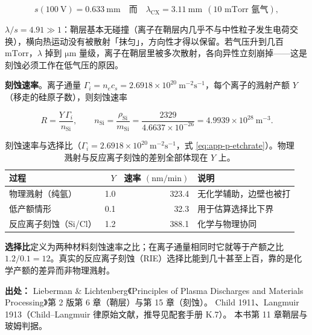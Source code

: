 \begin{equation}
  s(100\ \mathrm{V}) = 0.633\ \mathrm{mm}
  \quad\text{而}\quad
  \lambda_{\mathrm{CX}} = 3.11\ \mathrm{mm}
  \ \ (\text{10 mTorr 氩气}),
  \label{eq:app-p-mfp}
\end{equation}

$\lambda/s = 4.91\gg1$：鞘层基本无碰撞（离子在鞘层内几乎不与中性粒子发生电荷交换），横向热运动没有被散射「抹匀」，方向性才得以保留。若气压升到几百 $\mathrm{mTorr}$，$\lambda$ 掉到 $\mathrm{\mu m}$ 量级，离子在鞘层里被多次散射，各向异性立刻崩掉——这是刻蚀必须工作在低气压的原因。

\textbf{刻蚀速率}。离子通量 $\Gamma_i = n_ec_s = 2.6918\times10^{20}\ \mathrm{m^{-2}s^{-1}}$，每个离子的溅射产额 $Y$（移走的硅原子数），则刻蚀速率

\begin{equation}
  R = \frac{Y\,\Gamma_i}{n_{\mathrm{Si}}},
  \qquad n_{\mathrm{Si}} = \frac{\rho_{\mathrm{Si}}}{m_{\mathrm{Si}}} = \frac{2329}{4.6637\times10^{-26}} = 4.9939\times10^{28}\ \mathrm{m^{-3}}.
  \label{eq:app-p-etchrate}
\end{equation}

\begin{table}[htbp]
  \centering
  \small
  \caption{刻蚀速率与选择比（$\Gamma_i=2.6918\times10^{20}\ \mathrm{m^{-2}s^{-1}}$，式 \eqref{eq:app-p-etchrate}）。物理溅射与反应离子刻蚀的差别全部体现在 $Y$ 上。}
  \label{tab:app-p-etch}
  \begin{tabular}{@{}lrrl@{}}
    \toprule
    过程 & $Y$ & 速率 $(\mathrm{nm/min})$ & 说明 \\
    \midrule
    物理溅射（纯氩） & 1.0 & 323.4 & 无化学辅助，边壁也被打 \\
    低产额情形 & 0.1 & 32.3 & 用于估算选择比下界 \\
    反应离子刻蚀（Si/Cl） & 1.2 & 388.1 & 化学与物理协同 \\
    \bottomrule
  \end{tabular}
\end{table}

\textbf{选择比}定义为两种材料刻蚀速率之比；在离子通量相同时它就等于产额之比 $1.2/0.1 = 12$。真实的反应离子刻蚀（RIE）选择比能到几十甚至上百，靠的是化学产额的差异而非物理溅射。

{\footnotesize
\textbf{出处：} Lieberman \& Lichtenberg《Principles of Plasma Discharges and Materials Processing》第 2 版第 6 章（鞘层）与第 15 章（刻蚀）。
Child 1911、Langmuir 1913（Child--Langmuir 律原始文献，推导见配套手册 K.7）。
本书第 11 章鞘层与玻姆判据。
}

